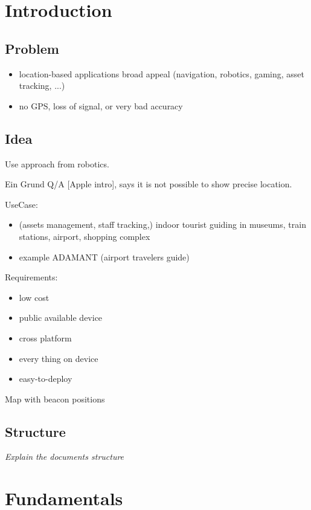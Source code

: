 \chapter{Introduction} \label{chap:intro}

\section{Problem}
\begin{itemize}
\item location-based applications broad appeal (navigation, robotics, gaming, asset tracking, ...)
\item no GPS, loss of signal, or very bad accuracy
\end{itemize}

\section{Idea}

Use approach from robotics.

Ein Grund Q/A [Apple intro], says it is not possible to show precise location.

UseCase:
\begin{itemize}
  \item (assets management, staff tracking,) indoor tourist guiding in museums, train stations, airport, shopping complex \citep{wang:bt_pos}
  \item example ADAMANT (airport travelers guide) \citep{wang:bt_pos}
\end{itemize}

Requirements:
\begin{itemize}
\item low cost
\item public available device
\item cross platform
\item every thing on device \citep{wang:bt_pos}
\item easy-to-deploy \citep{wang:bt_pos}
\end{itemize}

Map with beacon positions

\section{Structure}
\textit{Explain the documents structure}


\chapter{Fundamentals}\label{chap:fundamentals}

